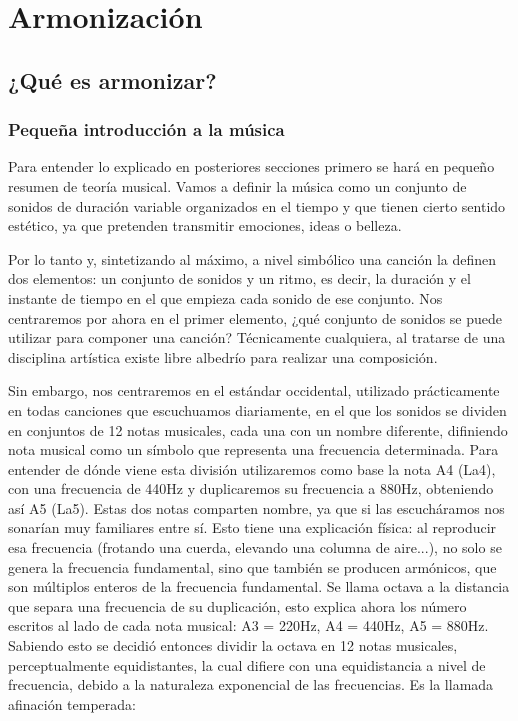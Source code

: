 \chapter{Armonización}
\label{cap:armonizacion}



\section{¿Qué es armonizar?}
    \subsection{Pequeña introducción a la música}\label{sec:arm:armonia}

        Para entender lo explicado en posteriores secciones primero se hará en pequeño resumen de teoría musical. Vamos a definir la música como un conjunto de sonidos de duración variable organizados en el tiempo y que tienen cierto sentido estético, ya que pretenden transmitir emociones, ideas o belleza.

        Por lo tanto y, sintetizando al máximo, a nivel simbólico una canción la definen dos elementos: un conjunto de sonidos y un ritmo, es decir, la duración y el instante de tiempo en el que empieza cada sonido de ese conjunto. Nos centraremos por ahora en el primer elemento, ¿qué conjunto de sonidos se puede utilizar para componer una canción?
        Técnicamente cualquiera, al tratarse de una disciplina artística existe libre albedrío para realizar una composición. 

        \label{arm:notas_musicales}
        Sin embargo, nos centraremos en el estándar occidental, utilizado prácticamente en todas canciones que escuchuamos diariamente, en el que los sonidos se dividen en conjuntos de 12 notas musicales, cada una con un nombre diferente, difiniendo nota musical como un símbolo que representa una frecuencia determinada. Para entender de dónde viene esta división utilizaremos como base la nota A4 (La4), con una frecuencia de 440Hz y duplicaremos su frecuencia a 880Hz, obteniendo así A5 (La5). Estas dos notas comparten nombre, ya que si las escucháramos nos sonarían muy familiares entre sí. Esto tiene una explicación física: al reproducir esa frecuencia (frotando una cuerda, elevando una columna de aire...), no solo se genera la frecuencia fundamental, sino que también se producen armónicos, que son múltiplos enteros de la frecuencia fundamental. Se llama octava a la distancia que separa una frecuencia de su duplicación, esto explica ahora los número escritos al lado de cada nota musical: A3 = 220Hz, A4 = 440Hz, A5 = 880Hz. Sabiendo esto se decidió entonces dividir la octava en 12 notas musicales, perceptualmente equidistantes, la cual difiere con una equidistancia a nivel de frecuencia, debido a la naturaleza exponencial de las frecuencias. Es la llamada afinación temperada:

